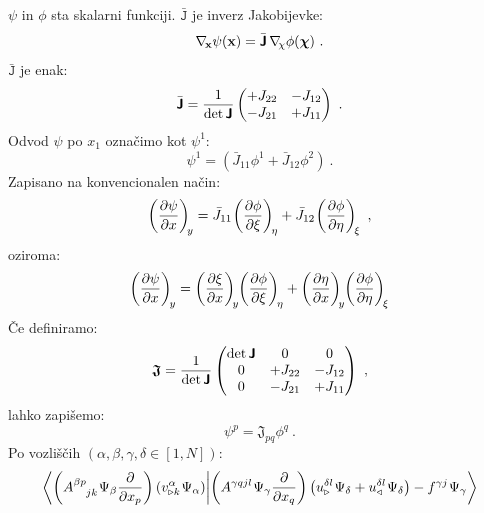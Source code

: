 $\psi$ in $\phi$ sta skalarni funkciji. $\bar{\texttt{J}}$ je inverz Jakobijevke:
\begin{equation}
   \mathbf{\nabla_{\mkern-3mu x}} \psi(\mathbf{x}) = \bar{\bm{\mathsf{J}}} \mkern3mu \mathbf{\nabla_{\mkern-4mu \chi}} \phi(\bm{\chi}) \ .
\end{equation}
$\bar{\texttt{J}}$ je enak:
\begin{equation}
   \bar{\bm{\mathsf{J}}}
   =
   \frac{1}{\det \bm{\mathsf{J}}}
   \begin{pmatrix}
      +J_{22} & -J_{12} \\
      -J_{21} & +J_{11}
   \end{pmatrix}
   \ .
\end{equation}
Odvod $\psi$ po $x_1$ označimo kot $\psi^1$:
\begin{equation}
   \psi^1 = \left(\bar{J}_{11} \phi^1 + \bar{J}_{12} \phi^2 \right) \ .
\end{equation}
Zapisano na konvencionalen način:
\begin{equation}
   \left(\frac{\partial \psi}{\partial x}\right)_{\mkern-4mu y}
   =
   \bar{J}_{11} \mkern-2mu \left(\frac{\partial \phi}{\partial \xi}\right)_{\mkern-3mu \eta}
   +
   \bar{J}_{12} \mkern-2mu \left(\frac{\partial \phi}{\partial \eta}\right)_{\mkern-3mu \xi} \ ,
\end{equation}
oziroma:
\begin{equation}
   \left(\frac{\partial \psi}{\partial x} \right)_{\mkern-3mu y}
   =
   \left(\frac{\partial \xi}{\partial x} \right)_{\mkern-4mu y}
      \mkern-4mu \left(\frac{\partial \phi}{\partial \xi}\right)_{\mkern-3mu \eta}
   +
   \left(\frac{\partial \eta}{\partial x}\right)_{\mkern-4mu y}
      \mkern-4mu \left(\frac{\partial \phi}{\partial \eta}\right)_{\mkern-3mu \xi}
\end{equation}
Če definiramo:
\begin{equation}
   \bm{\mathsf{\mathfrak{J}}}
   =
   \frac{1}{\det \bm{\mathsf{J}}}
   \begin{pmatrix}
      \det \bm{\mathsf{J}} & 0 & 0 \\
      0 & +J_{22} & -J_{12} \\
      0 & -J_{21} & +J_{11}
   \end{pmatrix} \ ,
\end{equation}
lahko zapišemo:
\begin{equation}
   \psi^p = \mathfrak{J}_{pq} \phi^{q} \ .
   \label{eq:refToEmt}
\end{equation}
Po vozliščih $(\alpha, \beta, \gamma, \delta \in [1,N])$:
\begin{equation}
   \bra{
      \left(A^{\beta p}_{\phantom{\beta p}jk} \mkern1mu \Psi_\beta \frac{\partial}{\partial x_p}\right)
         \left(v^\alpha_{\triangleright k} \mkern1mu \Psi_\alpha\right)}
   \ket{
      \left(A^{\gamma qjl} \mkern1mu \Psi_\gamma \frac{\partial}{\partial x_q}\right)
         \left(u^{\delta l}_\triangleright \mkern1mu \Psi_\delta + u^{\delta l}_\triangleleft \mkern1mu \Psi_\delta \right)
      -
      f^{\gamma j} \mkern1mu \Psi_\gamma }
\end{equation}
